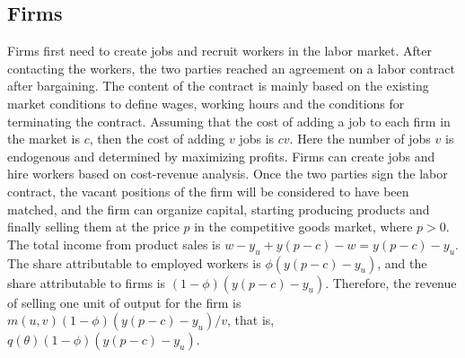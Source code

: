 \documentclass[ %
    final,
    scrbook,
    listoffigures,
    listoftables, 
    glossary]{cu-thesis}
\begin{document}
\subsection{Firms}
Firms first need to create jobs and recruit workers in the labor market. After contacting the workers, the two parties reached an agreement on a labor contract after bargaining. The content of the contract is mainly based on the existing market conditions to define wages, working hours and the conditions for terminating the contract. Assuming that the cost of adding a job to each firm in the market is $c$, then the cost of adding $v$ jobs is $cv$. Here the number of jobs $v$ is endogenous and determined by maximizing profits. Firms can create jobs and hire workers based on cost-revenue analysis. Once the two parties sign the labor contract, the vacant positions of the firm will be considered to have been matched, and the firm can organize capital, starting producing products and finally selling them at the price $p$ in the competitive goods market, where $p>0$. The total income from product sales is $w-y_u+y(p-c)-w=y(p-c)-y_u$. The share attributable to employed workers is $\phi(y(p-c)-y_u)$, and the share attributable to firms is $(1-\phi)(y(p-c)-y_u)$. Therefore, the revenue of selling one unit of output for the firm is $m(u,v)(1-\phi)(y(p-c)-y_u)/v$, that is, $q(\theta)(1-\phi)(y(p-c)-y_u)$.
\end{document}

